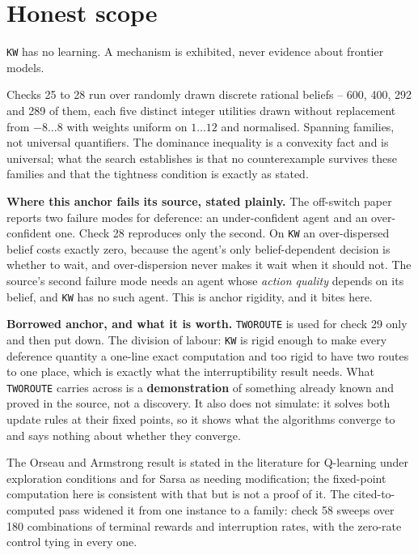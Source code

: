\section*{Honest scope}

\texttt{KW} has no learning. A mechanism is exhibited, never evidence about frontier models.

Checks 25 to 28 run over randomly drawn discrete rational beliefs -- 600, 400, 292 and 289 of them, each five distinct integer utilities drawn without replacement from $-8 \dots 8$ with weights uniform on $1 \dots 12$ and normalised. Spanning families, not universal quantifiers. The dominance inequality is a convexity fact and is universal; what the search establishes is that no counterexample survives these families and that the tightness condition is exactly as stated.

\textbf{Where this anchor fails its source, stated plainly.} The off-switch paper reports two failure modes for deference: an under-confident agent and an over-confident one. Check 28 reproduces only the second. On \texttt{KW} an over-dispersed belief costs exactly zero, because the agent's only belief-dependent decision is whether to wait, and over-dispersion never makes it wait when it should not. The source's second failure mode needs an agent whose \emph{action quality} depends on its belief, and \texttt{KW} has no such agent. This is anchor rigidity, and it bites here.

\textbf{Borrowed anchor, and what it is worth.} \texttt{TWOROUTE} is used for check 29 only and then put down. The division of labour: \texttt{KW} is rigid enough to make every deference quantity a one-line exact computation and too rigid to have two routes to one place, which is exactly what the interruptibility result needs. What \texttt{TWOROUTE} carries across is a \textbf{demonstration} of something already known and proved in the source, not a discovery. It also does not simulate: it solves both update rules at their fixed points, so it shows what the algorithms converge to and says nothing about whether they converge.

The Orseau and Armstrong result is stated in the literature for Q-learning under exploration conditions and for Sarsa as needing modification; the fixed-point computation here is consistent with that but is not a proof of it. The cited-to-computed pass widened it from one instance to a family: check 58 sweeps over 180 combinations of terminal rewards and interruption rates, with the zero-rate control tying in every one.

